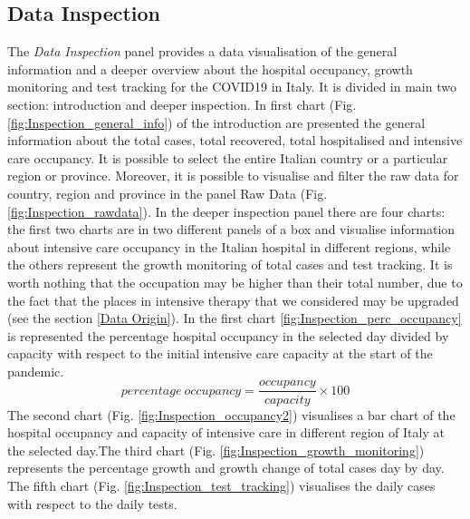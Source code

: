 \documentclass[
12pt, %
a4paper, %
oneside, %
headinclude,footinclude, %
BCOR5mm, %
]{scrartcl}
\begin{document}
\subsection{Data Inspection}\label{Data Inspection}

The \textit{Data Inspection} panel provides a data visualisation of the general information and a deeper overview about the hospital occupancy, growth monitoring and test tracking for the COVID19 in Italy. It is divided in main two section: introduction and deeper inspection. In first chart (Fig. \ref{fig:Inspection_general_info}) of the introduction are presented the general information about the total cases, total recovered, total hospitalised and intensive care occupancy. It is possible to select the entire Italian country or a particular region or province. Moreover, it is possible to visualise and filter the raw data for country, region and province in the panel Raw Data (Fig. \ref{fig:Inspection_rawdata}). In the deeper inspection panel there are four charts: the first two charts are in two different panels of a box and visualise information about intensive care occupancy in the Italian hospital in different regions, while the others represent the growth monitoring of total cases and test tracking. It is worth nothing that the occupation may be higher than their total number, due to the fact that the places in intensive therapy that we considered may be upgraded (see the section \ref{Data Origin}). In the first chart \ref{fig:Inspection_perc_occupancy} is represented the percentage hospital occupancy in the selected day divided by capacity with respect to the initial intensive care capacity at the start of the pandemic.
\begin{equation}
percentage~occupancy = \dfrac{occupancy}{capacity} \times 100
\end{equation}
The second chart (Fig. \ref{fig:Inspection_occupancy2}) visualises a bar chart of the hospital occupancy and capacity of intensive care in different region of Italy at the selected day.The third chart (Fig. \ref{fig:Inspection_growth_monitoring}) represents the percentage growth and growth change of total cases day by day. The fifth chart (Fig. \ref{fig:Inspection_test_tracking}) visualises the daily cases with respect to the daily tests.
\end{document}
